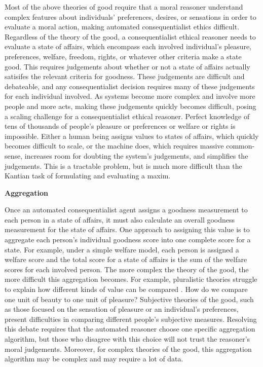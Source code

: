 \begin{isabellebody}
\begin{isamarkuptext}
Most of the above theories of good require that a moral reasoner understand complex features about
individuals' preferences, desires, or sensations in order to evaluate a moral action, making automated
consequentialist ethics difficult. Regardless of the theory of the good, a consequentialist ethical 
reasoner needs to evaluate a state of affairs, which encompass each involved individual's pleasure, 
preferences, welfare, freedom, rights, or whatever other criteria make a state good. This requires
judgements about whether or not a state of affairs actually satisifes the relevant criteria for goodness. 
These judgements are difficult and debateable, and any consequentialist decision requires many of 
these judgements for each individual involved. As systems become more complex and involve more people and 
more acts, making these judgements quickly becomes difficult, posing a scaling challenge for a 
consequentialist ethical reasoner. Perfect knowledge of tens of thousands of people's pleasure or 
preferences or welfare or rights is impossible. Either a human being 
assigns values to states of affairs, which quickly becomes difficult to scale, or the machine does, 
which requires massive common-sense, increases room for doubting the system's judgements, and simplifies
the judgements. This is a tractable problem, but is much more difficult than the Kantian task of formulating
and evaluating a maxim.%
\end{isamarkuptext}\isamarkuptrue%
%
\begin{isamarkuptext}%
\textbf{Aggregation}%
\end{isamarkuptext}\isamarkuptrue%
%
\begin{isamarkuptext}%
Once an automated consequentialist agent assigns a goodness measurement to each person in a state of affairs, it 
must also calculate an overall goodness measurement for the state of affairs. One approach to assigning
this value is to aggregate each person's individual goodness score into one complete score for a state. 
For example, under a simple welfare model, each person is assigned a welfare score and the total 
score for a state of affairs is the sum of the welfare scores for each involved person.
The more complex the theory of the good, the more difficult this aggregation becomes. For example, 
pluralistic theories struggle to explain how different kinds of value can be compared \cite{consequentialismsep}. 
How do we compare one unit of beauty to one unit of pleasure? Subjective theories of the good, such 
as those focused on the sensation of pleasure or an individual's preferences, present difficulties in 
comparing different people's subjective measures. Resolving this debate requires that the automated reasoner 
choose one specific aggregation algorithm, but those who disagree with this choice will not trust 
the reasoner's moral judgements. Moreover, for complex theories of the good, this aggregation algorithm
may be complex and may require a lot of data. 


\end{isamarkuptext}
\end{isabellebody}

